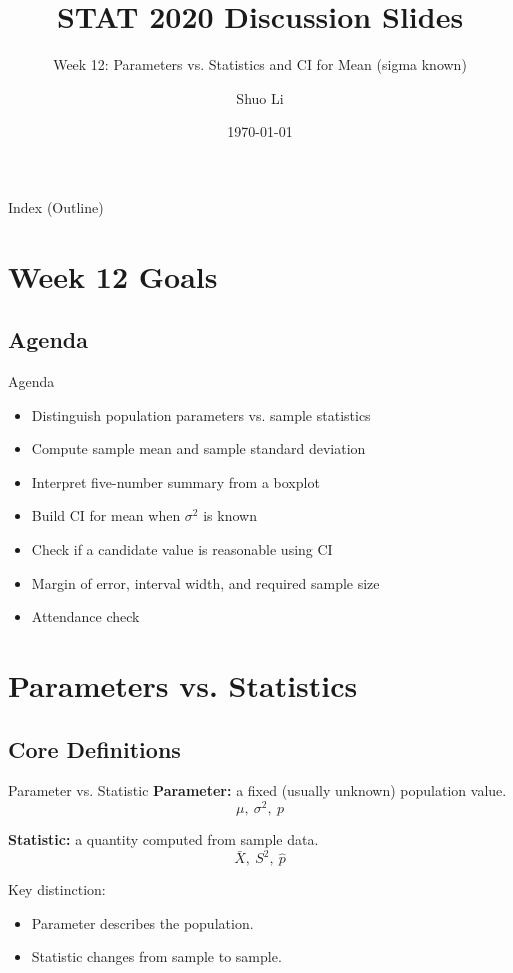 \documentclass[aspectratio=169]{beamer}
\title[STAT 2020 Week 12 \hfill \insertframenumber/\inserttotalframenumber]{STAT 2020 Discussion Slides}
\subtitle{Week 12: Parameters vs. Statistics and CI for Mean (sigma known)}
\author{Shuo Li}
\institute{University of Iowa}
\date{\today}
\begin{document}
\begin{frame}
  \titlepage
\end{frame}

\begin{frame}{Index (Outline)}
  \tableofcontents[hideallsubsections]
\end{frame}

\section{Week 12 Goals}

\subsection{Agenda}
\begin{frame}{Agenda}
  \begin{itemize}
    \item Distinguish population parameters vs. sample statistics
    \item Compute sample mean and sample standard deviation
    \item Interpret five-number summary from a boxplot
    \item Build CI for mean when \(\sigma^2\) is known
    \item Check if a candidate value is reasonable using CI
    \item Margin of error, interval width, and required sample size
    \item Attendance check
  \end{itemize}
\end{frame}

\section{Parameters vs. Statistics}

\subsection{Core Definitions}
\begin{frame}{Parameter vs. Statistic}
  \textbf{Parameter:} a fixed (usually unknown) population value.
  \[
    \mu,\ \sigma^2,\ p
  \]

  \textbf{Statistic:} a quantity computed from sample data.
  \[
    \bar X,\ S^2,\ \hat p
  \]

  \vspace{2mm}
  Key distinction:
  \begin{itemize}
    \item Parameter describes the population.
    \item Statistic changes from sample to sample.
  \end{itemize}
\end{frame}
\end{document}
